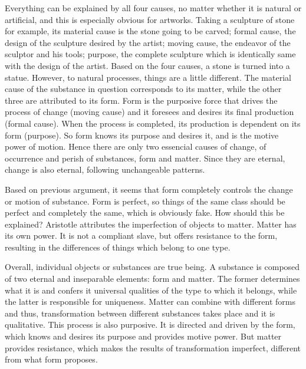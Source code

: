 \documentclass[11pt]{article}
\begin{document}
Everything can be explained by all four causes, no matter whether it is natural or artificial, and this is especially obvious for artworks. 
Taking a sculpture of stone for example, its material cause is the stone going to be carved; 
formal cause, the design of the sculpture desired by the artist; 
moving cause, the endeavor of the sculptor and his tools; 
purpose, the complete sculpture which is identically same with the design of the artist. 
Based on the four causes, a stone is turned into a statue. 
However, to natural processes, things are a little different. 
The material cause of the substance in question corresponds to its matter, while the other three are attributed to its form. 
Form is the purposive force that drives the process of change (moving cause) and it foresees and desires its final production (formal cause). 
When the process is completed, its production is dependent on its form (purpose). 
So form knows its purpose and desires it, and is the motive power of motion. 
Hence there are only two essencial causes of change, of occurrence and perish of substances, form and matter. 
Since they are eternal, change is also eternal, following unchangeable patterns.

\newline

Based on previous argument, it seems that form completely controls the change or motion of substance. 
Form is perfect, so things of the same class should be perfect and completely the same, which is obviously fake. 
How should this be explained? 
Aristotle attributes the imperfection of objects to matter. 
Matter has its own power. 
It is not a compliant slave, but offers resistance to the form, resulting in the differences of things which belong to one type.

\newline

Overall, individual objects or substances are true being. 
A substance is composed of two eternal and inseparable elements: form and matter. 
The former determines what it is and confers it universal qualities of the type to which it belongs, while the latter is responsible for uniqueness. 
Matter can combine with different forms and thus, transformation between different substances takes place and it is qualitative. 
This process is also purposive. 
It is directed and driven by the form, which knows and desires its purpose and provides motive power. 
But matter provides resistance, which makes the results of transformation imperfect, different from what form proposes. 
\end{document}
